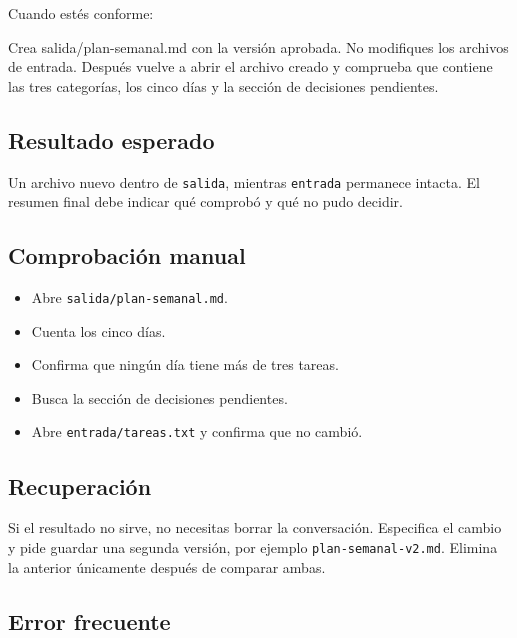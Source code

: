 \documentclass[10pt,a4paper,openany]{book}
\providecommand{\tightlist}{\setlength{\itemsep}{0.18em}\setlength{\parskip}{0pt}}
\newenvironment{Shaded}{}{}
\newcommand{\NormalTok}[1]{#1}
\renewenvironment{Shaded}
  {\begin{tcolorbox}[
    enhanced,
    breakable,
    colback=CodeBg,
    colframe=Border,
    boxrule=0.5pt,
    arc=2mm,
    left=3mm,
    right=3mm,
    top=2.2mm,
    bottom=2.2mm,
    before skip=0.8em,
    after skip=0.9em
  ]}
  {\end{tcolorbox}}
\begin{document}
Cuando estés conforme:

\begin{Shaded}
\begin{Highlighting}[]
\NormalTok{Crea salida/plan{-}semanal.md con la versión aprobada. No modifiques los archivos}
\NormalTok{de entrada. Después vuelve a abrir el archivo creado y comprueba que contiene}
\NormalTok{las tres categorías, los cinco días y la sección de decisiones pendientes.}
\end{Highlighting}
\end{Shaded}

\subsection{Resultado esperado}\label{resultado-esperado-2}

Un archivo nuevo dentro de \texttt{salida}, mientras \texttt{entrada}
permanece intacta. El resumen final debe indicar qué comprobó y qué no
pudo decidir.

\subsection{Comprobación manual}\label{comprobaciuxf3n-manual-1}

\begin{itemize}
\tightlist
\item
  Abre \texttt{salida/plan-semanal.md}.
\item
  Cuenta los cinco días.
\item
  Confirma que ningún día tiene más de tres tareas.
\item
  Busca la sección de decisiones pendientes.
\item
  Abre \texttt{entrada/tareas.txt} y confirma que no cambió.
\end{itemize}

\subsection{Recuperación}\label{recuperaciuxf3n-2}

Si el resultado no sirve, no necesitas borrar la conversación.
Especifica el cambio y pide guardar una segunda versión, por ejemplo
\texttt{plan-semanal-v2.md}. Elimina la anterior únicamente después de
comparar ambas.

\subsection{Error frecuente}\label{error-frecuente-4}
\end{document}
